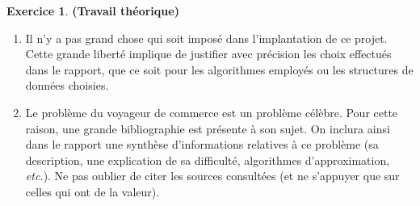 \documentclass[12pt]{article}
\theoremstyle{definition}
\newtheorem{Exercice}{Exercice}
\begin{document}
\begin{Exercice} {\bf (Travail théorique)}\smallskip

\begin{enumerate}
    \item Il n'y a pas grand chose qui soit imposé dans l'implantation
    de ce projet. Cette grande liberté implique de justifier avec
    précision les choix effectués dans le rapport, que ce soit pour
    les algorithmes employés ou les structures de données choisies.
    \smallskip

    \item Le problème du voyageur de commerce est un problème célèbre.
    Pour cette raison, une grande bibliographie est présente à son sujet.
    On inclura ainsi dans le rapport une synthèse d'informations
    relatives à ce problème (sa description, une explication de sa
    difficulté, algorithmes d'approximation, {\em etc.}). Ne pas oublier
    de citer les sources consultées (et ne s'appuyer que sur celles qui
    ont de la valeur).
\end{enumerate}
\end{Exercice}
\end{document}
